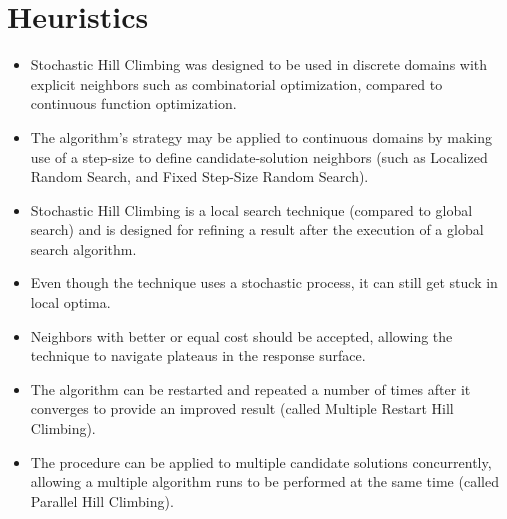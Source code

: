 \documentclass[a4paper, 11pt]{article}
\begin{document}
\section{Heuristics}
\label{sec:heuristics}
\begin{itemize}
	\item Stochastic Hill Climbing was designed to be used in discrete domains with explicit neighbors such as combinatorial optimization, compared to continuous function optimization. 
	\item The algorithm's strategy may be applied to continuous domains by making use of a step-size to define candidate-solution neighbors (such as Localized Random Search, and Fixed Step-Size Random Search).
	\item Stochastic Hill Climbing is a local search technique (compared to global search) and is designed for refining a result after the execution of a global search algorithm.
	\item Even though the technique uses a stochastic process, it can still get stuck in local optima.
	\item Neighbors with better or equal cost should be accepted, allowing the technique to navigate plateaus in the response surface.
	\item The algorithm can be restarted and repeated a number of times after it converges to provide an improved result (called Multiple Restart Hill Climbing).
	\item The procedure can be applied to multiple candidate solutions concurrently, allowing a multiple algorithm runs to be performed at the same time (called Parallel Hill Climbing).
\end{itemize}

\end{document}
